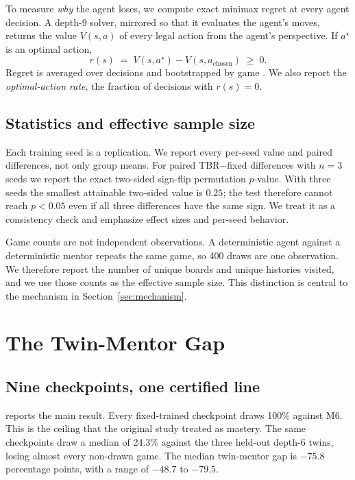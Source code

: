 \documentclass[conference]{IEEEtran}
\begin{document}
To measure \emph{why} the agent loses, we compute exact minimax regret at every agent decision. A depth-9 solver, mirrored so that it evaluates the agent's moves, returns the value $V(s,a)$ of every legal action from the agent's perspective. If $a^{\star}$ is an optimal action,
\begin{equation}
\label{eq:regret}
r(s) \;=\; V(s,a^{\star}) - V(s,a_{\text{chosen}}) \;\ge\; 0 .
\end{equation}
Regret is averaged over decisions and bootstrapped by game \cite{efron1993}. We also report the \emph{optimal-action rate}, the fraction of decisions with $r(s)=0$.

\subsection{Statistics and effective sample size}
Each training seed is a replication. We report every per-seed value and paired differences, not only group means. For paired TBR$-$fixed differences with $n=3$ seeds we report the exact two-sided sign-flip permutation $p$-value. With three seeds the smallest attainable two-sided value is $0.25$; the test therefore cannot reach $p<0.05$ even if all three differences have the same sign. We treat it as a consistency check and emphasize effect sizes and per-seed behavior.

Game counts are not independent observations. A deterministic agent against a deterministic mentor repeats the same game, so 400 draws are one observation. We therefore report the number of unique boards and unique histories visited, and we use those counts as the effective sample size. This distinction is central to the mechanism in Section~\ref{sec:mechanism}.

\section{The Twin-Mentor Gap}
\label{sec:gap}

\subsection{Nine checkpoints, one certified line}
 reports the main result. Every fixed-trained checkpoint draws 100\% against M6. This is the ceiling that the original study treated as mastery. The same checkpoints draw a median of 24.3\% against the three held-out depth-6 twins, losing almost every non-drawn game. The median twin-mentor gap is $-75.8$ percentage points, with a range of $-48.7$ to $-79.5$.
\end{document}
